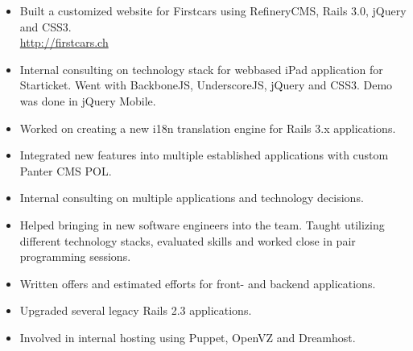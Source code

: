 \documentclass[10pt,a4paper]{moderncv}
\begin{document}
{\begin{itemize}
        \url{http://pianobeat.ch}
  \item Built a customized website for Firstcars using RefineryCMS, Rails 3.0,
    jQuery and CSS3.\\
        \url{http://firstcars.ch}
  \item Internal consulting on technology stack for webbased iPad application
    for Starticket. Went with BackboneJS, UnderscoreJS, jQuery and CSS3. Demo
    was done in jQuery Mobile.
  \item Worked on creating a new i18n translation engine for Rails 3.x
    applications.
  \item Integrated new features into multiple established applications with custom
    Panter CMS POL.
  \item Internal consulting on multiple applications and technology decisions.
  \item Helped bringing in new software engineers into the team. Taught
    utilizing different technology stacks, evaluated skills and worked close in
    pair programming sessions.
  \item Written offers and estimated efforts for front- and backend applications.
  \item Upgraded several legacy Rails 2.3 applications.
  \item Involved in internal hosting using Puppet, OpenVZ and Dreamhost.
\end{itemize}}
\end{document}
